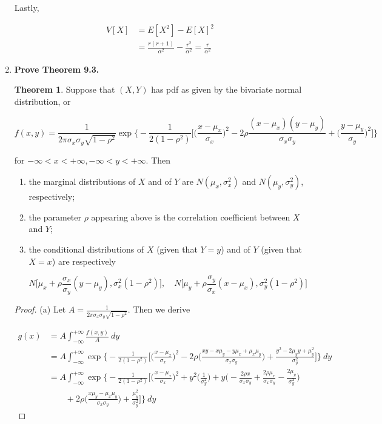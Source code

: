 \documentclass[10pt, oneside]{article}   	%
\theoremstyle{definition}
\newtheorem*{thm}{Theorem}
\begin{document}
\begin{enumerate}[label=9.\arabic*]
Lastly,

\begin{align*}
V[X] &= E[X^2] - E[X]^2 \\
&= \frac{r(r+1)}{\alpha^2} - \frac{r^2}{\alpha^2} = \boxed{\frac{r}{\alpha^2}}
\end{align*}

\item  \begin{tcolorbox}[
  colback=Cerulean!5!white,
  colframe=Cerulean!75!black]
\textbf{Prove Theorem 9.3.}
\end{tcolorbox}

\begin{thm}
Suppose that $(X,Y)$ has pdf as given by the bivariate normal distribution, or

\[ f(x,y) = \frac{1}{2\pi \sigma_x \sigma_y \sqrt{1-\rho^2}} \exp \bigg\{ -\frac{1}{2(1-\rho^2)} \bigg[ \bigg( \frac{x - \mu_x}{\sigma_x} \bigg)^2 - 2\rho \frac{(x - \mu_x)(y - \mu_y)}{\sigma_x \sigma_y} + \bigg( \frac{y - \mu_y}{\sigma_y} \bigg)^2 \bigg] \bigg\}  \]

for $-\infty < x < +\infty, -\infty < y < +\infty$. Then

\begin{enumerate}
\item the marginal distributions of $X$ and of $Y$ are $N(\mu_x, \sigma^2_x)$ and $N(\mu_y, \sigma^2_y)$, respectively; 
\item the parameter $\rho$ appearing above is the correlation coefficient between $X$ and $Y$;
\item the conditional distributions of $X$ (given that $Y = y$) and of $Y$ (given that $X = x$) are respectively

\[ N \bigg[ \mu_x + \rho \frac{\sigma_x}{\sigma_y} (y - \mu_y), \sigma^2_x (1 - \rho^2) \bigg], \quad N \bigg[ \mu_y + \rho \frac{\sigma_y}{\sigma_x} (x - \mu_x), \sigma^2_y (1 - \rho^2) \bigg]  \]
\end{enumerate}
\end{thm}

\begin{proof}
(a) Let $A = \frac{1}{2\pi \sigma_x \sigma_y \sqrt{1-\rho^2}}$. Then we derive

\begin{align*}
g(x) &= A \int^{+\infty}_{-\infty} \frac{f(x,y)}{A} \ dy \\
&= A \int^{+\infty}_{-\infty} \exp \bigg\{ -\frac{1}{2(1 - \rho^2)} \bigg[ \bigg( \frac{x - \mu_x}{\sigma_x} \bigg)^2 - 2\rho \bigg( \frac{xy - x\mu_y - y \mu_x + \mu_x \mu_y}{\sigma_x \sigma_y} \bigg) + \frac{y^2 - 2\mu_y y + \mu^2_y}{\sigma^2_y} \bigg] \bigg\} \ dy \\
&= A \int^{+\infty}_{-\infty} \exp \bigg\{ -\frac{1}{2(1-\rho^2)} \bigg[ \bigg( \frac{x - \mu_x}{\sigma_x} \bigg)^2 + y^2 \bigg( \frac{1}{\sigma^2_y} \bigg) + y \bigg( -\frac{2\rho x}{\sigma_x \sigma_y} + \frac{2\rho \mu_x}{\sigma_x \sigma_y} - \frac{2\mu_y}{\sigma^2_y} \bigg)  \\
&\quad \quad + 2\rho \bigg( \frac{x \mu_y - \mu_x \mu_y}{\sigma_x \sigma_y} \bigg) + \frac{\mu^2_y}{\sigma^2_y} \bigg] \bigg\} \ dy
\end{align*}


\end{proof}
\end{enumerate}
\end{document}
